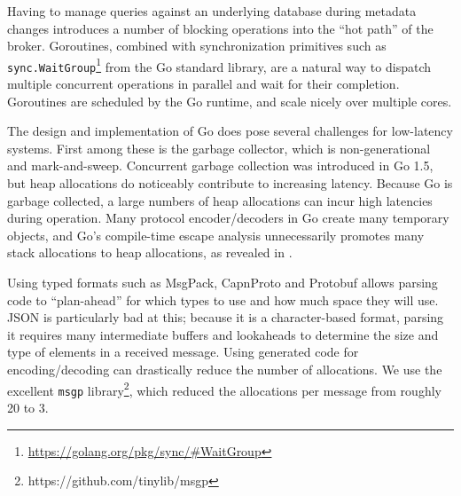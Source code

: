 Having to manage queries against an underlying database during metadata changes introduces a number of blocking operations into the ``hot path'' of the broker.
Goroutines, combined with synchronization primitives such as \texttt{sync.WaitGroup}\footnote{\url{https://golang.org/pkg/sync/#WaitGroup}} from the Go standard library, are a natural way to dispatch multiple concurrent operations in parallel and wait for their completion.
Goroutines are scheduled by the Go runtime, and scale nicely over multiple cores.

The design and implementation of Go does pose several challenges for low-latency systems.
First among these is the garbage collector, which is non-generational and mark-and-sweep.
Concurrent garbage collection was introduced in Go 1.5, but heap allocations do noticeably contribute to increasing latency.
Because Go is garbage collected, a large numbers of heap allocations can incur high latencies during
operation.
Many protocol encoder/decoders in Go create many temporary objects, and Go's compile-time escape analysis unnecessarily promotes many stack allocations to heap allocations, as revealed
in \cite{goescape}.

Using typed formats such as MsgPack, CapnProto and Protobuf allows parsing code to ``plan-ahead'' for which types to use and how much space they will use.
JSON is particularly bad at this; because it is a character-based format, parsing it requires many intermediate buffers and lookaheads to determine the size and type of elements in a received message.
Using generated code for encoding/decoding can drastically reduce the number of allocations. We use the excellent \texttt{msgp} library\footnote{https://github.com/tinylib/msgp}, which reduced the allocations per message from roughly 20 to 3.



